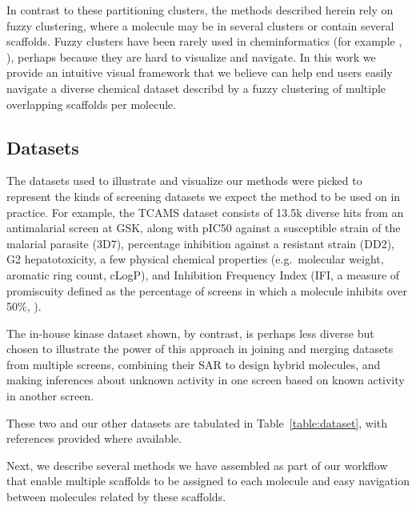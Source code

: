 \documentclass[journal=jacsat,manuscript=article]{achemso}
\newcommand*\tref[1]{Table~\ref{table:#1}}
\newcommand*\eg{e.g.~}
\begin{document}
In contrast to these partitioning clusters, the methods described herein rely on fuzzy clustering, where a molecule may be in several clusters or contain several scaffolds. Fuzzy clusters have been rarely used in cheminformatics (for example \cite{Holliday2004}, \cite{Richmond2015Galois}), perhaps because they are hard to visualize and navigate.  In this work we provide an intuitive visual framework that we believe can help end users easily navigate a diverse chemical dataset describd by a fuzzy clustering of multiple overlapping scaffolds per molecule.    

\subsection{Datasets}
\label{sec:datasets}
The datasets used to illustrate and visualize our methods were picked to represent the kinds of screening datasets we expect the method to be used on in practice. For example, the TCAMS dataset\cite{Gamo2010} consists of 13.5k diverse hits from an antimalarial screen at GSK, along with pIC50 against a susceptible strain of the malarial parasite (3D7), percentage inhibition against a resistant strain (DD2), G2 hepatotoxicity, a few physical chemical properties (\eg molecular weight, aromatic ring count, cLogP), and Inhibition Frequency Index (IFI, a measure of promiscuity defined as the percentage of screens in which a molecule inhibits over 50\%, \cite{Chakravorty2013IFI}).   

The in-house kinase dataset shown, by contrast, is perhaps less diverse but chosen to illustrate the power of this approach in joining and merging datasets from multiple screens, combining their SAR to design hybrid molecules, and making inferences about unknown activity in one screen based on known activity in another screen.

These two and our other datasets are tabulated in \tref{dataset}, with references provided where available.

Next, we describe several methods we have assembled as part of our workflow that enable multiple scaffolds to be assigned to each molecule and easy navigation between molecules related by these scaffolds. 


\end{document}
